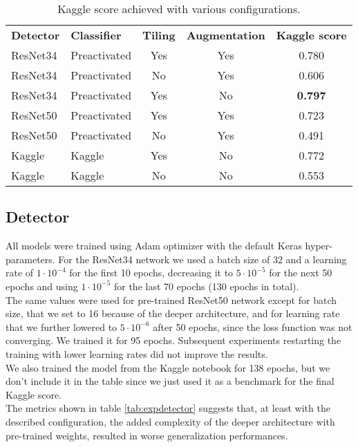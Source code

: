 \begin{table*}[h]
	\centering
	\begin{tabular}{llccc}
		\rowcolor[HTML]{EFEFEF} 
		\textbf{Detector} & \textbf{Classifier} & \textbf{Tiling} & \textbf{Augmentation} & \textbf{Kaggle score} \\
		ResNet34          & Preactivated        & Yes             & Yes                   & 0.780                 \\
		ResNet34          & Preactivated        & No              & Yes                   & 0.606                 \\
		ResNet34          & Preactivated        & Yes             & No                    & \textbf{0.797}                      \\
		ResNet50          & Preactivated        & Yes             & Yes                   & 0.723                      \\
		ResNet50          & Preactivated        & No              & Yes                   & 0.491                 \\
		Kaggle            & Kaggle              & Yes             & No                   &  0.772                     \\
		Kaggle            & Kaggle              & No              & No                   & 0.553                     
	\end{tabular}
	\caption{Kaggle score achieved with various configurations.}
	\label{tab:finaltests}
\end{table*}

\subsection{Detector}
\label{ssec:detectorexp}

All models were trained using Adam optimizer with the default Keras hyper-parameters. For the ResNet34 network we used a batch size of $32$ and a learning rate of $1 \cdot 10^{-4}$ for the first 10 epochs, decreasing it to $5 \cdot 10^{-5}$ for the next 50 epochs and using $1 \cdot 10^{-5}$ for the last 70 epochs (130 epochs in total). \\
The same values were used for pre-trained ResNet50 network except for batch size, that we set to 16 because of the deeper architecture, and for learning rate that we further lowered to $5 \cdot 10^{-6}$ after 50 epochs, since the loss function was not converging. We trained it for 95 epochs. Subsequent experiments restarting the training with lower learning rates did not improve the results.\\
We also trained the model from the Kaggle notebook for 138 epochs, but we don't include it in the table since we just used it as a benchmark for the final Kaggle score.\\
The metrics shown in table \ref{tab:expdetector} suggests that, at least with the described configuration, the added complexity of the deeper architecture with pre-trained weights, resulted in worse generalization performances.

